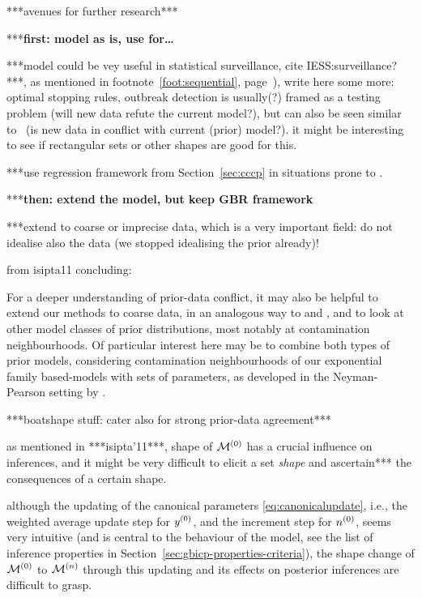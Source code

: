 ***avenues for further research***

***\textbf{first: model as is, use for\dots }

***model could be vey useful in statistical surveillance, cite IESS:surveillance?***,
as mentioned in footnote~\ref{foot:sequential}, page~\pageref{foot:sequential}),
write here some more: optimal stopping rules, outbreak detection is usually(?)
framed as a testing problem (will new data refute the current model?),
but can also be seen similar to \pdc\ (is new data in conflict with current (prior) model?).
it might be interesting to see if rectangular sets or other shapes are good for this.  

***use regression framework from Section~\ref{sec:cccp} in situations prone to \pdc.


***\textbf{then: extend the model, but keep GBR framework}

***extend to coarse or imprecise data, which is a very important field:
do not idealise also the data (we stopped idealising the prior already)!

from isipta11 concluding:
\begin{small}
For a deeper understanding of prior-data conflict, it may also be helpful
to extend our methods to coarse data, in an analogous way to \textcite{2007:utkinaugustin} and
\textcite{2009:Troffaes:Coolen}, and to look at other model classes of prior distributions, most
notably at contamination neighbourhoods. Of particular interest here may
be to combine both types of prior models, considering contamination
neighbourhoods of our exponential family based-models with sets of
parameters, as developed in the Neyman-Pearson setting by
\textcite[\S~5]{2002:augustin}.
\end{small}


***boatshape stuff: cater also for strong prior-data agreement***

as mentioned in ***isipta'11***, shape of $\mathcal{M}^{(0)}$ has a crucial influence on inferences,
and it might be very difficult to elicit a set \emph{shape} and ascertain*** the consequences of a certain shape.

although the updating of the canonical parameters \eqref{eq:canonicalupdate},
i.e., the weighted average update step for $y^{(0)}$, and the increment step for $n^{(0)}$,
seems very intuitive (and is central to the behaviour of the model,
see the list of inference properties in Section~\ref{sec:gbicp-properties-criteria}),
the shape change of $\mathcal{M}^{(0)}$ to $\mathcal{M}^{(n)}$ through this updating and its effects on posterior inferences are difficult to grasp.

